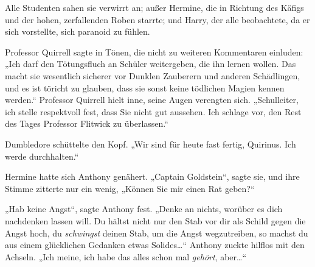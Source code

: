 Alle Studenten sahen sie verwirrt an; außer Hermine, die in Richtung des Käfigs und der hohen, zerfallenden Roben starrte; und Harry, der alle beobachtete, da er sich vorstellte, sich paranoid zu fühlen.

Professor Quirrell sagte in Tönen, die nicht zu weiteren Kommentaren einluden: „Ich darf den Tötungsfluch an Schüler weitergeben, die ihn lernen wollen. Das macht sie wesentlich sicherer vor Dunklen Zauberern und anderen Schädlingen, und es ist töricht zu glauben, dass sie sonst keine tödlichen Magien kennen werden.“ Professor Quirrell hielt inne, seine Augen verengten sich. „Schulleiter, ich stelle respektvoll fest, dass Sie nicht gut aussehen. Ich schlage vor, den Rest des Tages Professor Flitwick zu überlassen.“

Dumbledore schüttelte den Kopf. „Wir sind für heute fast fertig, Quirinus. Ich werde durchhalten.“

Hermine hatte sich Anthony genähert. „Captain Goldstein“, sagte sie, und ihre Stimme zitterte nur ein wenig, „Können Sie mir einen Rat geben?“

„Hab keine Angst“, sagte Anthony fest. „Denke an nichts, worüber es dich nachdenken lassen will. Du hältst nicht nur den Stab vor dir als Schild gegen die Angst hoch, du \emph{schwingst} deinen Stab, um die Angst wegzutreiben, so machst du aus einem glücklichen Gedanken etwas Solides…“ Anthony zuckte hilflos mit den Achseln. „Ich meine, ich habe das alles schon mal \emph{gehört}, aber…“

